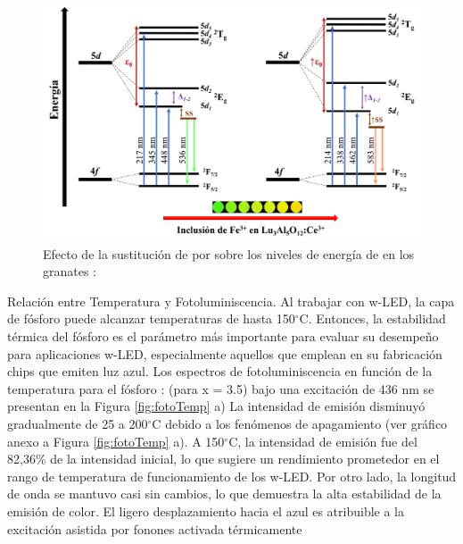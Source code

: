 \begin{figure}[h]
    \centering%

    \includegraphics[width=\textwidth]{Kap4/NivelesEnergia.png}%
    \caption{Efecto de la sustitución de  por  sobre
    los niveles de energía de  en los granates
    :}\label{fig:niveles}
\end{figure}

Relación entre Temperatura y Fotoluminiscencia. Al trabajar con w-LED, la capa
de fósforo puede alcanzar temperaturas de hasta 150$^{\circ}$C. Entonces, la
estabilidad térmica del fósforo es el parámetro más importante para evaluar su
desempeño para aplicaciones w-LED, especialmente aquellos que emplean en su
fabricación chips que emiten luz azul. Los espectros de fotoluminiscencia en
función de la temperatura para el fósforo
: (para x = 3.5)
bajo una excitación de 436 nm se presentan en la Figura \ref{fig:fotoTemp} a)
La intensidad de
emisión disminuyó gradualmente de 25 a 200$^{\circ}$C debido a los fenómenos de
apagamiento (ver gráfico anexo a Figura \ref{fig:fotoTemp} a). A 150$^{\circ}$C, la
intensidad de
emisión fue del 82,36\% de la intensidad inicial, lo que sugiere un rendimiento
prometedor en el rango de temperatura de funcionamiento de los w-LED. Por otro
lado, la longitud de onda se mantuvo casi sin cambios, lo que demuestra la alta
estabilidad de la emisión de color. El ligero desplazamiento hacia el azul es
atribuible a la excitación asistida por fonones activada térmicamente
\cite{Xia2011}\\

